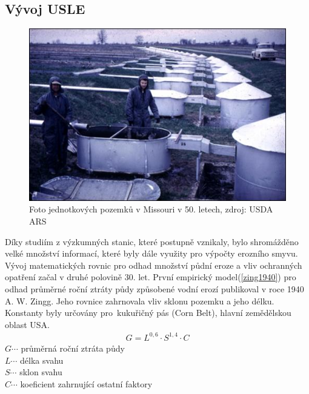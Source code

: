 \subsection{Vývoj USLE}
\begin{figure}[H]
    \centering \includegraphics[scale=0.85]{./pictures/unit_plots.jpg}
      \caption[Foto jednotkových pozemků v Missouri v 50. letech]{Foto
        jednotkových pozemků v Missouri v 50. letech, zdroj: USDA
        ARS\cite{usda_ars}}
      \label{fig:unit_plots}
\end{figure}
Díky studiím z výzkumných stanic, které postupně vznikaly, bylo
shromážděno velké množství informací, které byly dále využity pro
výpočty erozního smyvu. Vývoj matematických rovnic pro odhad množství
půdní eroze a vliv ochranných opatření začal v druhé polovině
30. let. První empirický model(\ref{zing1940}) pro odhad průměrné
roční ztráty půdy způsobené vodní erozí publikoval v roce 1940
A. W. Zingg. Jeho rovnice zahrnovala vliv sklonu pozemku a jeho
délku. Konstanty byly určovány pro~kukuřičný pás (Corn Belt), hlavní
zemědělskou oblast USA.\cite{ZINGG1940}
\begin{align}
   \label{zing1940} G=L^{0,6}\cdot S^{1,4}\cdot C
\end{align}
\hspace*{2cm}$G \cdots$ průměrná roční ztráta půdy\\
\hspace*{2cm}$L \cdots$ délka svahu \\
\hspace*{2cm}$S \cdots$ sklon svahu \\
\hspace*{2cm}$C \cdots$ koeficient zahrnující ostatní faktory\\

